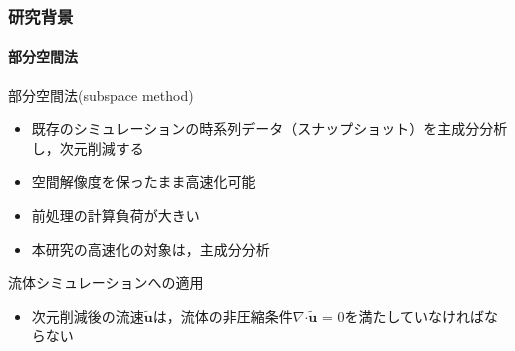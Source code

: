 \documentclass[aspectratio=169,dvipdfmx,hyperref={bookmarks=true}]{beamer}
\begin{document}
   \begin{frame}
  \frametitle{研究背景}
      \framesubtitle{部分空間法}
\begin{block}{部分空間法(subspace method)}
\begin{itemize}
\item 既存のシミュレーションの時系列データ（スナップショット）を主成分分析し，次元削減する
\item 空間解像度を保ったまま高速化可能
\item 前処理の計算負荷が大きい
\item 本研究の高速化の対象は，主成分分析
\end{itemize}
\end{block}
\begin{block}{流体シミュレーションへの適用}
\begin{itemize}
	\item 次元削減後の流速$\bm{\widetilde{u}}$は，流体の非圧縮条件$\nabla\boldsymbol{\cdot}\bm{\widetilde{u}}$ = 0を満たしていなければならない
\end{itemize}
\end{block}
 \end{frame}
\end{document}
